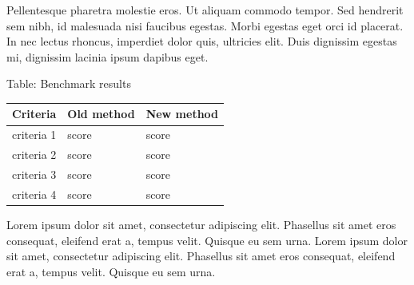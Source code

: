 \documentclass[generic]{tudposter} %
\begin{document}
\begin{multicols}{2}
Pellentesque pharetra molestie eros. Ut aliquam commodo tempor. Sed hendrerit sem nibh, id malesuada nisi faucibus egestas. Morbi egestas eget orci id placerat. In nec lectus rhoncus, imperdiet dolor quis, ultricies elit. Duis dignissim egestas mi, dignissim lacinia ipsum dapibus eget.\\


\begin{minipage}[h!]{\linewidth}
	\centering
	{Table: Benchmark results}\\
	\vspace{1cm}
	\begin{tabular}{| m{8cm}  |  m{11cm}  | m{11cm}  |}\hline
		\textbf{Criteria} & \textbf{Old method} & \textbf{New method} \\\hline
		criteria 1 & score & score \\\hline
		criteria 2 & score & score \\\hline
		criteria 3 & score & score \\\hline
		criteria 4 & score & score \\\hline
	\end{tabular}
	\vspace{2cm}
\end{minipage}

Lorem ipsum dolor sit amet, consectetur adipiscing elit. Phasellus sit amet eros consequat, eleifend erat a, tempus velit. Quisque eu sem urna. Lorem ipsum dolor sit amet, consectetur adipiscing elit. Phasellus sit amet eros consequat, eleifend erat a, tempus velit. Quisque eu sem urna.\\
\end{multicols}
\end{document}
